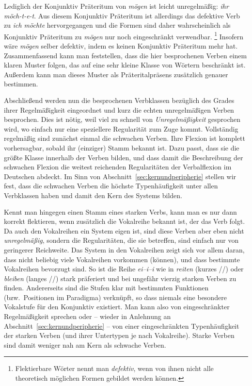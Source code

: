 Lediglich der Konjunktiv Präteritum von \textit{mögen} ist leicht unregelmäßig: \textit{ihr möch-t-e-t}.
Aus diesem Konjunktiv Präteritum ist allerdings das defektive Verb zu \textit{ich möchte} hervorgegangen und die Formen sind daher wahrscheinlich als Konjunktiv Präteritum zu \textit{mögen} nur noch eingeschränkt verwendbar.%
\footnote{Flektierbare Wörter nennt man \textit{defektiv}, wenn von ihnen nicht alle theoretisch möglichen Formen gebildet werden können.}
Insofern wäre \textit{mögen} selber defektiv, indem es keinen Konjunktiv Präteritum mehr hat.
Zusammenfassend kann man feststellen, dass die hier besprochenen Verben einem klaren Muster folgen, das auf eine sehr kleine Klasse von Wörtern beschränkt ist.
Außerdem kann man dieses Muster als Präteritalpräsens zusätzlich genauer bestimmen.


Abschließend werden nun die besprochenen Verbklassen bezüglich des Grades ihrer Regelmäßigkeit eingeordnet und kurz die echten unregelmäßigen Verben besprochen.
Dies ist nötig, weil viel zu schnell von \textit{Unregelmäßigkeit} gesprochen wird, wo einfach nur eine speziellere Regularität zum Zuge kommt.
Vollständig regelmäßig sind zunächst einmal die schwachen Verben.
Ihre Flexion ist komplett vorhersagbar, sobald ihr (einziger) Stamm bekannt ist.
Dazu passt, dass sie die größte Klasse innerhalb der Verben bilden, und dass damit die Beschreibung der schwachen Flexion die weitest reichenden Regularitäten der Verbalflexion im Deutschen abdeckt.
Im Sinn von Abschnitt~\ref{sec:kernundperipherie} stellen wir fest, dass die schwachen Verben die höchste Typenhäufigkeit unter allen Verbklassen haben und damit den Kern des Systems bilden.

Kennt man hingegen einen Stamm eines starken Verbs, kann man es nur dann korrekt flektieren, wenn zusätzlich die Vokalreihe bekannt ist, der das Verb folgt.
Da auch den Vokalreihen ein System eigen ist, sind diese Verben aber eben nicht \textit{unregelmäßig}, sondern die Regularitäten, die sie betreffen, sind einfach nur von geringerer Reichweite.
Das System in den Vokalreihen zeigt sich vor allem daran, dass nicht beliebig viele Vokalreihen vorkommen (können), und dass bestimmte Vokalreihen bevorzugt sind.
So ist \zB die Reihe \textit{ei--i--i} wie in \textit{reiten} (kurzes //) oder \textit{bleiben} (langes //) stark präferiert und bei ungefähr vierzig starken Verben zu finden.
Andererseits sind die Stufen klar mit bestimmten Funktionen (bzw.\ Positionen im Paradigma) verknüpft, so dass \zB niemals eine besondere Vokalstufe für den Konjunktiv existiert.
Man kann also von eingeschränkter Regelmäßigkeit sprechen oder -- wieder in Anlehnung an Abschnitt~\ref{sec:kernundperipherie} -- von einer eingeschränkten Typenhäufigkeit der starken Verben (und ihrer Untertypen je nach Vokalreihe).
Starke Verben sind damit weniger nah am Kern als schwache Verben.

